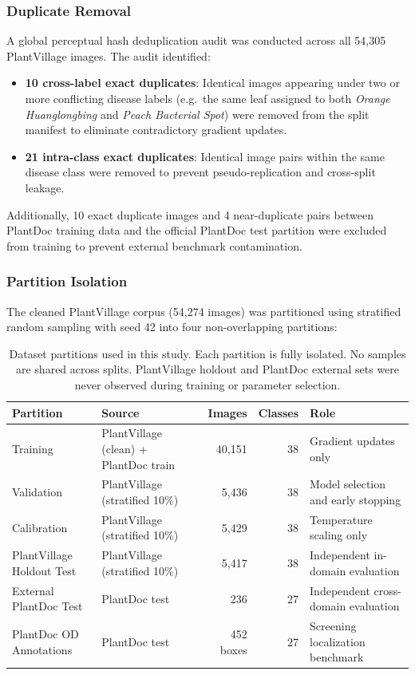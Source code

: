\documentclass[pdflatex,sn-mathphys-num]{sn-jnl}
\begin{document}
\subsubsection{Duplicate Removal}

A global perceptual hash deduplication audit was conducted across all 54{,}305
PlantVillage images. The audit identified:
\begin{itemize}
  \item \textbf{10 cross-label exact duplicates}: Identical images appearing under two
        or more conflicting disease labels (e.g.\ the same leaf assigned to both
        \textit{Orange Huanglongbing} and \textit{Peach Bacterial Spot}) were removed
        from the split manifest to eliminate contradictory gradient updates.
  \item \textbf{21 intra-class exact duplicates}: Identical image pairs within the same
        disease class were removed to prevent pseudo-replication and cross-split leakage.
\end{itemize}

Additionally, 10 exact duplicate images and 4 near-duplicate pairs between PlantDoc
training data and the official PlantDoc test partition were excluded from training to
prevent external benchmark contamination.

\subsubsection{Partition Isolation}

The cleaned PlantVillage corpus (54{,}274 images) was partitioned using stratified
random sampling with seed 42 into four non-overlapping partitions:

\begin{table}[H]
\caption{Dataset partitions used in this study. Each partition is fully isolated. No
samples are shared across splits. PlantVillage holdout and PlantDoc external sets were
never observed during training or parameter selection.}
\label{tab:dataset_partitions}
\centering
\begin{tabularx}{\linewidth}{lXrrl}
\toprule
\textbf{Partition} & \textbf{Source} & \textbf{Images} & \textbf{Classes} & \textbf{Role} \\
\midrule
Training & PlantVillage (clean) + PlantDoc train & 40{,}151 & 38 & Gradient updates only \\
Validation & PlantVillage (stratified 10\%) & 5{,}436 & 38 & Model selection and early stopping \\
Calibration & PlantVillage (stratified 10\%) & 5{,}429 & 38 & Temperature scaling only \\
PlantVillage Holdout Test & PlantVillage (stratified 10\%) & 5{,}417 & 38 & Independent in-domain evaluation \\
External PlantDoc Test & PlantDoc test & 236 & 27 & Independent cross-domain evaluation \\
PlantDoc OD Annotations & PlantDoc test & 452 boxes & 27 & Screening localization benchmark \\
\bottomrule
\end{tabularx}
\end{table}
\end{document}
